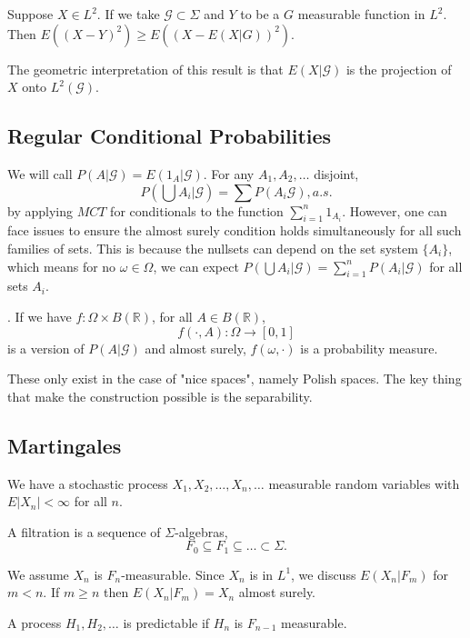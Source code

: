 \documentclass[11pt]{scrartcl}
\newcommand{\R}{\mathbb{R}}
\let \mc \mathcal
\begin{document}
\begin{thm} Suppose $X \in L^2$.  If we take $\mathcal G \subset \Sigma$ and $Y$ to be a $G$ measurable function in $L^2$.  Then $E((X-Y)^2) \ge E((X - E(X|G))^2)$.
\end{thm}  
\begin{remark} The geometric interpretation of this result is that $E(X|\mathcal G)$ is the projection of $X$ onto $L^2(\mathcal G)$.
\end{remark}
\subsection{Regular Conditional Probabilities}
We will call $P(A|\mathcal G) = E(1_A| \mathcal G)$.  For any $A_1, A_2, \dots$ disjoint,
$$P(\bigcup A_i | \mc G) = \sum P(A_i \mc G), a.s.$$
by applying $MCT$ for conditionals to the function $\sum_{i=1}^n 1_{A_i}$.  However, one can face issues to ensure the almost surely condition holds simultaneously for all such families of sets.  This is because the nullsets can depend on the set system $\{A_i\}$, which means for no $\omega \in \Omega$, we can expect $P(\bigcup A_i | \mathcal G) = \sum_{i=1}^n P(A_i | \mathcal G)$ for all sets $A_i$. 


\begin{definition}.  If we have $f: \Omega \times B(\R)$, for all $A \in B(\R)$, $$f(\cdot, A): \Omega \to [0, 1]$$
is a version of $P(A|\mathcal G)$ and almost surely, $f(\omega, \cdot)$ is a probability measure.
\end{definition}
\begin{remark} These only exist in the case of "nice spaces", namely Polish spaces.  The key thing that make the construction possible is the separability.
\end{remark}
\subsection{Martingales}
We have a stochastic process $X_1, X_2, \dots, X_n, \dots$ measurable random variables with $E|X_n| < \infty$ for all $n$.  
\begin{definition} A filtration is a sequence of $\Sigma$-algebras,
$$F_0 \subseteq F_1 \subseteq \dots \subset \Sigma.$$
\end{definition}
We assume $X_n$ is $F_n$-measurable.  Since $X_n$ is in $L^1$, we discuss $E(X_n|F_m)$ for $m < n$.  If $m \ge n$ then $E(X_n|F_m) = X_n$ almost surely.

\begin{definition} A process $H_1, H_2, \dots$ is predictable if $H_n$ is $F_{n-1}$ measurable.
\end{definition}
\end{document}
